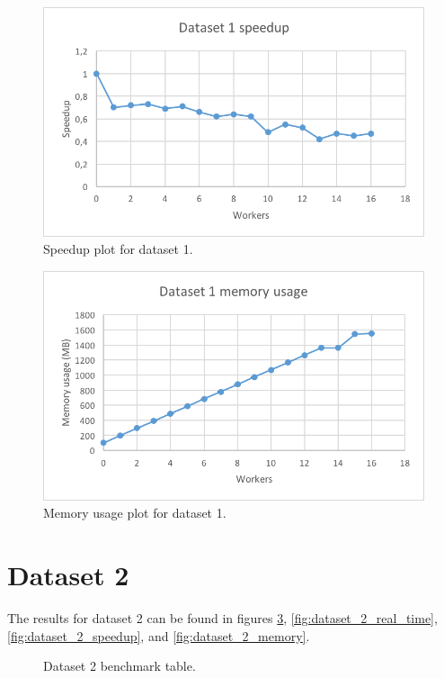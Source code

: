 \begin{figure}[ht]
  \centering
  \includegraphics[width=120mm]{figures/dataset_1/dataset_1_speedup.png}
  \caption[Speedup plot for dataset 1.]{Speedup plot for dataset 1.}
  \label{fig:dataset_1_speedup}
\end{figure}

\begin{figure}[ht]
  \centering
  \includegraphics[width=120mm]{figures/dataset_1/dataset_1_memory.png}
  \caption[Memory usage plot for dataset 1.]{Memory usage plot for dataset 1.}
  \label{fig:dataset_1_memory}
\end{figure}

\section{Dataset 2}
The results for dataset 2 can be found in figures \ref{fig:dataset_2_table}, \ref{fig:dataset_2_real_time}, \ref{fig:dataset_2_speedup}, and \ref{fig:dataset_2_memory}.

\begin{figure}[ht]
\centering
{}
\caption[Dataset 2 benchmark table.]{Dataset 2 benchmark table.}
\label{fig:dataset_2_table}
\end{figure}

